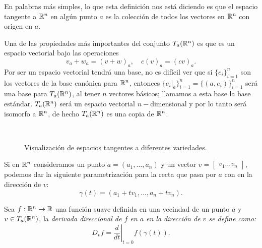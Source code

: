 En palabras más simples, lo que esta definición nos está diciendo es que el espacio tangente a $\mathbb{R}^n$ en algún punto $a$ es la colección de todos los vectores en $\mathbb{R}^n$ con origen en $a$.

Una de las propiedades más importantes del conjunto $T_a(\mathbb{R}^n)$ es que es un espacio vectorial bajo las operaciones
\[ v_a + w_a = (v + w)_{a}, \quad c(v)_{a} = (cv)_{a}. \]
Por ser un espacio vectorial tendrá una base, no es difícil ver que si $\{e_i\}_{i=1}^n$ son los vectores de la base canónica para $\mathbb{R}^n$, entonces $\{e_i|_{a}\}_{i=1}^n = \{(a,e_i)\}_{i=1}^n$ será una base para $T_a(\mathbb{R}^n)$, al tener $n$ vectores básicos; llamamos a esta base la base estándar. $T_a(\mathbb{R}^n)$ será un espacio vectorial $n-$dimensional y por lo tanto será isomorfo a $\mathbb{R}^n$, de hecho $T_a(\mathbb{R}^n)$ es una copia de $\mathbb{R}^n$.
\begin{center}
	\begin{figure}[h]
		\centering
		\begin{subfigure}{0.30\textwidth}
			\centering
			
		\end{subfigure}
		\hspace{60pt}
		\begin{subfigure}{0.30\textwidth}
			\centering
			
		\end{subfigure}
		\\[20pt]
		\begin{subfigure}{0.30\textwidth}
			\centering
			
		\end{subfigure}
		\hspace{60pt}
		\begin{subfigure}{0.30\textwidth}
			\centering
			
		\end{subfigure}
		\caption{Visualización de espacios tangentes a diferentes variedades.}
	\end{figure}
\end{center}
Si en $\mathbb{R}^n$ consideramos un punto $a = (a_1, \dots, a_n)$ y un vector $v = \begin{bmatrix} v_1 \dots v_n \end{bmatrix}$, podemos dar la siguiente parametrización para la recta que pasa por $a$ con en la dirección de $v$:
\[ \gamma(t) = (a_1 + tv_1, \dots, a_n + tv_n). \]

\begin{definition}\label{Definción: Derivada Direccional}
	Sea $f: \mathbb{R}^n \to \mathbb{R}$ una función suave definida en una vecindad de un punto $a$ y $v \in T_a(\mathbb{R}^n)$, la \it{derivada direccional} de $f$ en $a$ en la dirección de $v$ se define como:
	\[ D_v f = \left. \frac{d}{dt} \right|_{t=0} f(\gamma(t)). \]
\end{definition}

